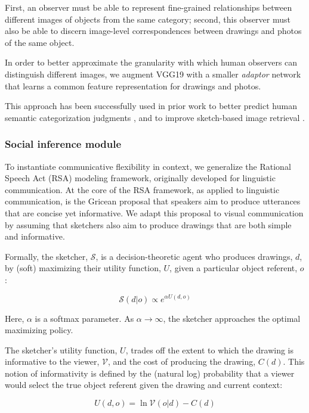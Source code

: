 \documentclass[9pt,twocolumn,twoside]{pnas-new}
\begin{document}
First, an observer must be able to represent fine-grained relationships between different images of objects from the same category; second, this observer must also be able to discern image-level correspondences between drawings and photos of the same object. 

In order to better approximate the granularity with which human observers can distinguish different images, we augment VGG19 with a smaller \textit{adaptor} network that learns a common feature representation for drawings and photos. 

This approach has been successfully used in prior work to better predict human semantic categorization judgments \cite{peterson2016adapting}, and to improve sketch-based image retrieval \cite[]{sangkloy2016sketchy}. 


\subsubsection*{Social inference module}

To instantiate communicative flexibility in context, we generalize the Rational Speech Act (RSA) modeling framework, originally developed for linguistic communication. At the core of the RSA framework, as applied to linguistic communication, is the Gricean proposal that speakers aim to produce utterances that are concise yet informative. We adapt this proposal to visual communication by assuming that sketchers also aim to produce drawings that are both simple and informative. 

Formally, the sketcher, $\mathcal{S}$, is a decision-theoretic agent who produces drawings, $d$, by (soft) maximizing their utility function, $U$, given a particular object referent, $o$: 

\begin{equation}
\mathcal{S}(d|o) \propto e^{\alpha U(d,o)}
\end{equation}

Here, $\alpha$ is a softmax parameter. As $\alpha \rightarrow \infty$, the sketcher approaches the optimal maximizing policy. 

The sketcher's utility function, $U$, trades off the extent to which the drawing is informative to the viewer, $\mathcal{V}$, and the cost of producing the drawing, $C(d)$. This notion of informativity is defined by the (natural log) probability that a viewer would select the true object referent given the drawing and current context:

\begin{equation} \label{sketcher_utility}
U(d, o) = \ln \mathcal{V}(o|d) - C(d)
\end{equation}
\end{document}
